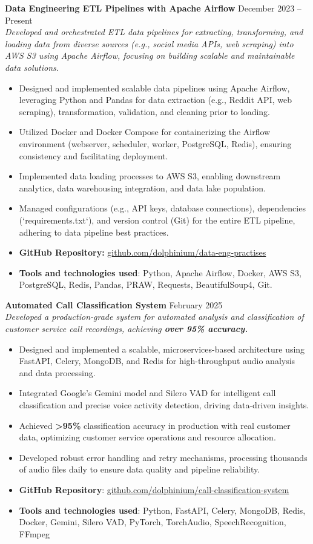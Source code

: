 \documentclass[10pt, a4paper]{article}
\newcommand{\projectitem}[3]{%
  \par\needspace{3\baselineskip}%
  \noindent%
  \textbf{#1} \hfill #2 \\%
  \textit{#3}%
  \par %
}
\begin{document}
\projectitem{Data Engineering ETL Pipelines with Apache Airflow}{December 2023 -- Present}
             {Developed and orchestrated ETL data pipelines for extracting, transforming, and loading data from diverse sources (e.g., social media APIs, web scraping) into AWS S3 using Apache Airflow, focusing on building scalable and maintainable data solutions.}
\begin{itemize}
    \item Designed and implemented scalable data pipelines using Apache Airflow, leveraging Python and Pandas for data extraction (e.g., Reddit API, web scraping), transformation, validation, and cleaning prior to loading.
    \item Utilized Docker and Docker Compose for containerizing the Airflow environment (webserver, scheduler, worker, PostgreSQL, Redis), ensuring consistency and facilitating deployment.
    \item Implemented data loading processes to AWS S3, enabling downstream analytics, data warehousing integration, and data lake population.
    \item Managed configurations (e.g., API keys, database connections), dependencies (`requirements.txt`), and version control (Git) for the entire ETL pipeline, adhering to data pipeline best practices.
    \item \textbf{GitHub Repository:} \href{https://github.com/dolphinium/data-eng-practises}{github.com/dolphinium/data-eng-practises}
    \item \textbf{Tools and technologies used}: Python, Apache Airflow, Docker, AWS S3, PostgreSQL, Redis, Pandas, PRAW, Requests, BeautifulSoup4, Git.
\end{itemize}

\projectitem{Automated Call Classification System}{February 2025}
             {Developed a production-grade system for automated analysis and classification of customer service call recordings, achieving \textbf{over 95\% accuracy.}}
\begin{itemize}
    \item Designed and implemented a scalable, microservices-based architecture using FastAPI, Celery, MongoDB, and Redis for high-throughput audio analysis and data processing.
    \item Integrated Google's Gemini model and Silero VAD for intelligent call classification and precise voice activity detection, driving data-driven insights.
    \item Achieved \textbf{>95\%} classification accuracy in production with real customer data, optimizing customer service operations and resource allocation.
    \item Developed robust error handling and retry mechanisms, processing thousands of audio files daily to ensure data quality and pipeline reliability.
    \item \textbf{GitHub Repository}: \href{https://github.com/dolphinium/call-classification-system}{github.com/dolphinium/call-classification-system}
    \item \textbf{Tools and technologies used}: Python, FastAPI, Celery, MongoDB, Redis, Docker, Gemini, Silero VAD, PyTorch, TorchAudio, SpeechRecognition, FFmpeg
\end{itemize}
\end{document}
